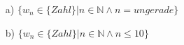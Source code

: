 \begin{enumerate}
	\item[a)] $\{w_n\in \{Zahl\}|n\in \mathbb{N} \wedge n = ungerade\}$
	\item[b)] $\{w_n\in \{Zahl\}|n\in \mathbb{N} \wedge n \leq 10\}$
\end{enumerate}
